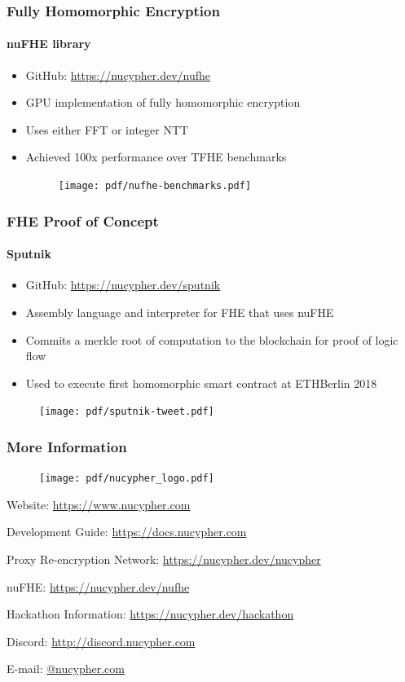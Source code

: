\documentclass[xetex,mathsans,sans,aspectratio=169]{beamer}
\begin{document}
    \begin{frame}
      \frametitle{Fully Homomorphic Encryption}
       \framesubtitle{nuFHE library}
       \begin{itemize}
           \item GitHub: \url{https://nucypher.dev/nufhe}
           \item GPU implementation of fully homomorphic encryption
           \item Uses either FFT or integer NTT
           \item Achieved 100x performance over TFHE benchmarks
           \begin{figure}
               \texttt{[image: pdf/nufhe-benchmarks.pdf]}
           \end{figure}
       \end{itemize}
     \end{frame}

    \begin{frame}
      \frametitle{FHE Proof of Concept}
      \framesubtitle{Sputnik}
      \begin{itemize}
        \item GitHub: \url{https://nucypher.dev/sputnik}
        \item Assembly language and interpreter for FHE that uses nuFHE
        \item Commits a merkle root of computation to the blockchain for proof of logic flow
        \item Used to execute first homomorphic smart contract at ETHBerlin 2018
      \end{itemize}
      \begin{figure}
        \centering
        \texttt{[image: pdf/sputnik-tweet.pdf]}
      \end{figure}
    \end{frame}

    \begin{frame}
        \frametitle{More Information}
        \begin{figure}
            \centering
            \texttt{[image: pdf/nucypher\_logo.pdf]}
        \end{figure}
        Website: \url{https://www.nucypher.com}

        Development Guide: \url{https://docs.nucypher.com}

        Proxy Re-encryption Network: \url{https://nucypher.dev/nucypher}

        nuFHE: \url{https://nucypher.dev/nufhe}

        Hackathon Information: \url{https://nucypher.dev/hackathon}

        Discord: \url{http://discord.nucypher.com}

        E-mail: \href{mailto:\emailname @nucypher.com}{\emailname @nucypher.com}
    \end{frame}
\end{document}
